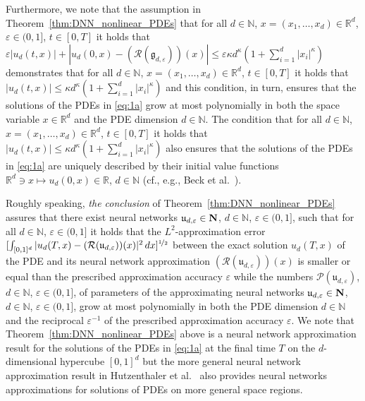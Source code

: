 \documentclass[12pt]{article}
\theoremstyle{definition}
\newcommand{\R}{\mathbb{R}}
\newcommand{\N}{\mathbb{N}}
\begin{document}
Furthermore, we note that 
the assumption in Theorem~\ref{thm:DNN_nonlinear_PDEs} 
that for all 
$ d \in \N $, $ x = (x_1, \dots, x_d) \in \R^d $, 
$ \varepsilon \in (0,1] $, $ t \in [0,T] $ 
it holds that 
$ 
  \varepsilon | u_d(t,x) | 
  + \allowbreak 
  | u_d(0,x) \allowbreak - ( \mathcal{R}(\mathfrak{g}_{d,\varepsilon}) )(x) | 
  \le \varepsilon \kappa d^\kappa (1 + \sum_{ i = 1 }^d | x_i |^\kappa ) 
$
demonstrates that 
for all 
$ d \in \N $, $ x = (x_1, \dots, x_d) \in \R^d $, 
$ t \in [0,T] $ 
it holds that 
$ 
  | u_d(t,x) | 
  \le \kappa d^\kappa (1 + \sum_{ i = 1 }^d | x_i |^\kappa ) 
$
and this condition, in turn, ensures 
that the solutions of the PDEs in \eqref{eq:1a} 
grow at most polynomially 
in both the space variable $ x \in \R^d $
and the PDE dimension $ d \in \N $. 
The condition that 
for all 
$ d \in \N $, $ x = (x_1, \dots, x_d) \in \R^d $, 
$ t \in [0,T] $ 
it holds that 
$ 
  | u_d(t,x) | 
  \le \kappa d^\kappa (1 + \sum_{ i = 1 }^d | x_i |^\kappa ) 
$
also ensures that the solutions of the PDEs in \eqref{eq:1a} 
are uniquely described by their initial value 
functions 
$
  \R^d \ni x \mapsto u_d(0,x) \in \R
$,
$ d \in \N $ (cf., e.g., Beck et al.~\cite[Theorem~1.1]{beck2020nonlinear}).



Roughly speaking, \emph{the conclusion} of Theorem~\ref{thm:DNN_nonlinear_PDEs} 
assures that there exist neural networks 
$ \mathfrak{u}_{d,\varepsilon} \in {\bf N} $,
$ d \in \N $, $ \varepsilon \in (0,1] $,
%
such that for all 
$ d \in \N $, $ \varepsilon \in (0,1] $ 
it holds that the $ L^2 $-approximation error 
$
  [ 
    \int_{ [0,1]^d } 
      | 
        u_d(T,x) - 
        ( \mathcal{R}( \mathfrak{u}_{ d, \varepsilon } ) )(x) 
      |^2 
    \,
    dx 
  ]^{ \nicefrac{ 1 }{ 2 } } 
$
between the exact solution 
$
  u_d(T,x)
$
of the PDE 
and its neural network approximation 
$
  ( \mathcal{R}( \mathfrak{u}_{ d, \varepsilon } ) )(x) 
$
is smaller or equal than 
the prescribed approximation accuracy 
$ \varepsilon $ 
while the numbers  
$
  \mathcal{P}( \mathfrak{u}_{d,\varepsilon} ) 
$,
$ d \in \N $,
$ \varepsilon \in (0,1] $,
of parameters 
of the approximating neural networks 
$ \mathfrak{u}_{d,\varepsilon} \in {\bf N} $,
$ d \in \N $, $ \varepsilon \in (0,1] $, 
grow at most polynomially 
in both 
the PDE dimension $ d \in \N $ 
and the reciprocal $ \varepsilon^{ - 1 } $ 
of the prescribed approximation accuracy $ \varepsilon $. 
We note that Theorem~\ref{thm:DNN_nonlinear_PDEs} 
above is a neural network approximation result 
for the solutions 
of the PDEs in \eqref{eq:1a} at the final time $ T $ 
on the $ d $-dimensional hypercube $ [0,1]^d $ 
but the more general neural network approximation result 
in Hutzenthaler et al.~\cite[Theorem~4.1]{hutzenthaler2020proof}
also provides neural networks approximations 
for solutions 
of PDEs 
on more general space regions. 
\end{document}
